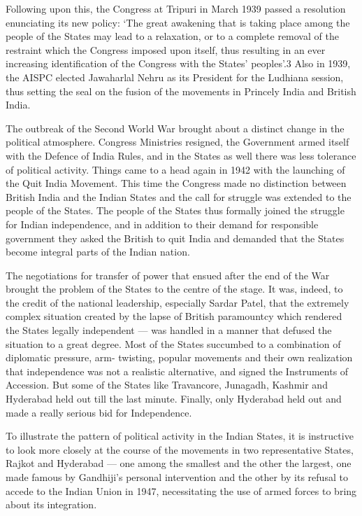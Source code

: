 Following upon this, the Congress at Tripuri in March 1939 passed a resolution enunciating its new policy: ‘The great awakening that is taking place among the people of the States may lead to a relaxation, or to a complete removal of the restraint which the Congress imposed upon itself, thus resulting in an ever increasing identification of the Congress with the States’ peoples’.3 Also in 1939, the AISPC elected Jawaharlal Nehru as its President for the Ludhiana session, thus setting the seal on the fusion of the movements in Princely India and British India. 

The outbreak of the Second World War brought about a distinct change in the political atmosphere. Congress Ministries resigned, the Government armed itself with the Defence of India Rules, and in the States as well there was less tolerance of political activity. Things came to a head again in 1942 with the launching of the Quit India Movement. This time the Congress made no distinction between British India and the Indian States and the call for struggle was extended to the people of the States. The people of the States thus formally joined the struggle for Indian independence, and in addition to their demand for responsible government they asked the British to quit India and demanded that the States become integral parts of the Indian nation. 

The negotiations for transfer of power that ensued after the end of the War brought the problem of the States to the centre of the stage. It was, indeed, to the credit of the national leadership, especially Sardar Patel, that the extremely complex situation created by the lapse of British paramountcy which rendered the States legally independent — was handled in a manner that defused the situation to a great degree. Most of the States succumbed to a combination of diplomatic pressure, arm- twisting, popular movements and their own realization that independence was not a realistic alternative, and signed the Instruments of Accession. But some of the States like Travancore, Junagadh, Kashmir and Hyderabad held out till the last minute. Finally, only Hyderabad held out and made a really serious bid for Independence. 

To illustrate the pattern of political activity in the Indian States, it is instructive to look more closely at the course of the movements in two representative States, Rajkot and Hyderabad — one among the smallest and the other the largest, one made famous by Gandhiji’s personal intervention and the other by its refusal to accede to the Indian Union in 1947, necessitating the use of armed forces to bring about its integration.

